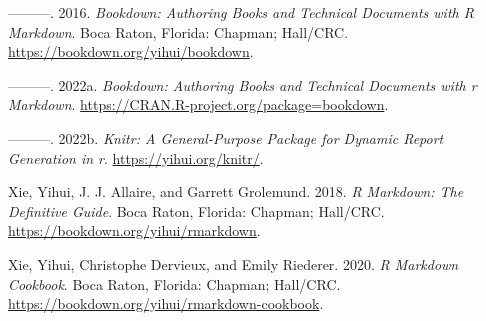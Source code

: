 \documentclass[
]{book}
\newlength{\cslhangindent}
\newlength{\cslentryspacingunit} %
\newenvironment{CSLReferences}[2] %
 {%
  \setlength{\parindent}{0pt}
  \ifodd #1
  \let\oldpar\par
  \def\par{\hangindent=\cslhangindent\oldpar}
  \fi
  \setlength{\parskip}{#2\cslentryspacingunit}
 }%
 {}
\begin{document}
\begin{CSLReferences}{1}{0}
\leavevmode{}%
---------. 2016. \emph{Bookdown: Authoring Books and Technical Documents with {R} Markdown}. Boca Raton, Florida: Chapman; Hall/CRC. \url{https://bookdown.org/yihui/bookdown}.

\leavevmode{}%
---------. 2022a. \emph{Bookdown: Authoring Books and Technical Documents with r Markdown}. \url{https://CRAN.R-project.org/package=bookdown}.

\leavevmode{}%
---------. 2022b. \emph{Knitr: A General-Purpose Package for Dynamic Report Generation in r}. \url{https://yihui.org/knitr/}.

\leavevmode{}%
Xie, Yihui, J. J. Allaire, and Garrett Grolemund. 2018. \emph{R Markdown: The Definitive Guide}. Boca Raton, Florida: Chapman; Hall/CRC. \url{https://bookdown.org/yihui/rmarkdown}.

\leavevmode{}%
Xie, Yihui, Christophe Dervieux, and Emily Riederer. 2020. \emph{R Markdown Cookbook}. Boca Raton, Florida: Chapman; Hall/CRC. \url{https://bookdown.org/yihui/rmarkdown-cookbook}.

\end{CSLReferences}
\end{document}
